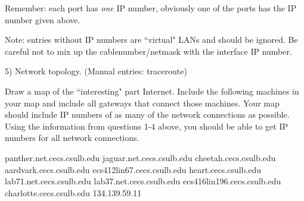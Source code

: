 Remember: each port has {\it one} IP number, obviously
one of the ports has the IP number given above.

Note: entries without IP numbers are ``virtual" LANs and should
be ignored.
Be careful not to mix up the cablenumber/netmask with the interface
IP number.

5) Network topology. 
(Manual entries: traceroute)

Draw a map of the ``interesting" part Internet.
Include the following machines in your map and include all gateways
that connect those machines.
Your map should include IP numbers of as many of the network connections
as possible.
Using the information from questions 1-4 above, you should be able
to get IP numbers for all network connections.

\medskip

{\obeylines\parskip=0pt

panther.net.cecs.csulb.edu
jaguar.net.cecs.csulb.edu
cheetah.cecs.csulb.edu
aardvark.cecs.csulb.edu
ecs412lin67.cecs.csulb.edu
heart.cecs.csulb.edu
lab71.net.cecs.csulb.edu
lab37.net.cecs.csulb.edu
ecs416lin196.cecs.csulb.edu
charlotte.cecs.csulb.edu
134.139.59.11

}
\bye
